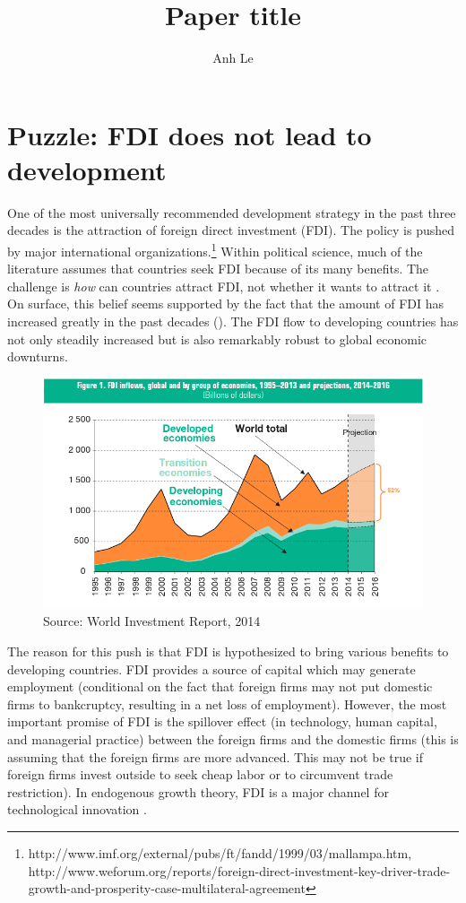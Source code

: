\documentclass[12pt]{article}
\title{Paper title}
\author{Anh Le}
\begin{document}
\maketitle

\section{Puzzle: FDI does not lead to development}

One of the most universally recommended development strategy in the past three decades is the attraction of foreign direct investment (FDI). The policy is pushed by major international organizations.\footnote{http://www.imf.org/external/pubs/ft/fandd/1999/03/mallampa.htm, http://www.weforum.org/reports/foreign-direct-investment-key-driver-trade-growth-and-prosperity-case-multilateral-agreement} Within political science, much of the literature assumes that countries seek FDI because of its many benefits. The challenge is \textit{how} can countries attract FDI, not whether it wants to attract it \citep{Jensen2003, Li2003, Li2006, Ahlquist2006}. On surface, this belief seems supported by the fact that the amount of FDI has increased greatly in the past decades (). The FDI flow to developing countries has not only steadily increased but is also remarkably robust to global economic downturns.

\begin{figure}[!ht]
\includegraphics[width=\textwidth, height=\textheight,keepaspectratio]{../figure/global_fdi}
\caption{Source: World Investment Report, 2014}
\label{fig:globalfdi}
\end{figure}

The reason for this push is that FDI is hypothesized to bring various benefits to developing countries. FDI provides a source of capital which may generate employment (conditional on the fact that foreign firms may not put domestic firms to bankcruptcy, resulting in a net loss of employment). However, the most important promise of FDI is the spillover effect (in technology, human capital, and managerial practice) between the foreign firms and the domestic firms (this is assuming that the foreign firms are more advanced. This may not be true if foreign firms invest outside to seek cheap labor or to circumvent trade restriction). In endogenous growth theory, FDI is a major channel for technological innovation \citep{Findlay1978}.
\end{document}
